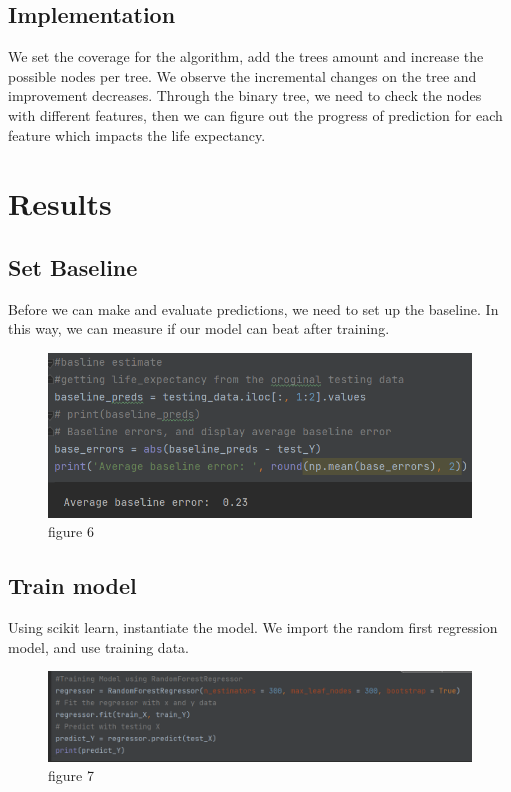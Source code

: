 \documentclass{article}
\begin{document}
\subsection{Implementation}
We set the coverage for the algorithm, add the trees amount and increase the possible nodes per tree. We observe the incremental changes on the tree and improvement decreases. Through the binary tree, we need to check the nodes with different features, then we can figure out the progress of prediction for each feature which impacts the life expectancy.  

\section{Results}
\subsection{Set Baseline}
Before we can make and evaluate predictions, we need to set up the baseline. In this way, we can measure if our model can beat after training. 
\begin{figure}[H]
    \centering
    \includegraphics[width = 0.9\linewidth]{6.png}
    \caption{figure 6}
\end{figure}

\subsection{Train model}
Using scikit learn, instantiate the model. We import the random first regression model, and use training data.
\begin{figure}[H]
    \centering
    \includegraphics[width = 0.9\linewidth]{7.png}
    \caption{figure 7}
\end{figure}
\end{document}
